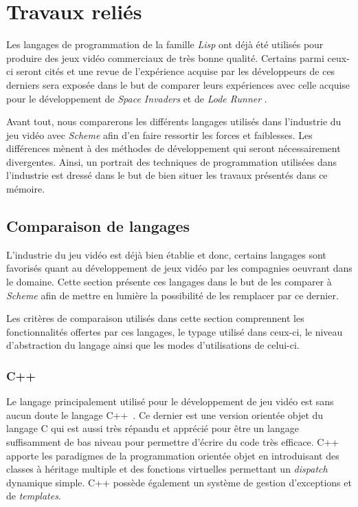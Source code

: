\documentclass[12pt,twoside,letterpaper,francais]{book}
\newcommand{\lr}{{\textit{Lode Runner }}}
\newcommand{\si}{{\textit{Space Invaders }}}
\newcommand{\lisp}{{\textit{Lisp }}}
\newcommand{\Schemelang}{{\textit{Scheme }}}
\begin{document}
\clearpage

\chapter{Travaux reliés}
Les langages de programmation de la famille \lisp ont déjà été
utilisés pour produire des jeux vidéo commerciaux de très bonne
qualité. Certains parmi ceux-ci seront cités et une revue de
l'expérience acquise par les développeurs de ces derniers sera exposée
dans le but de comparer leurs expériences avec celle acquise pour le
développement de \si et de \lr.

Avant tout, nous comparerons les différents langages utilisés dans
l'industrie du jeu vidéo avec \Schemelang afin d'en faire ressortir les
forces et faiblesses. Les différences mènent à des méthodes de
développement qui seront nécessairement divergentes. Ainsi, un
portrait des techniques de programmation utilisées dans l'industrie
est dressé dans le but de bien situer les travaux présentés dans ce
mémoire.


\FloatBarrier
\section{Comparaison de langages}
L'industrie du jeu vidéo est déjà bien établie et donc, certains
langages sont favorisés quant au développement de jeux vidéo par les
compagnies oeuvrant dans le domaine. Cette section présente ces
langages dans le but de les comparer à \Schemelang afin de mettre en
lumière la possibilité de les remplacer par ce dernier.

Les critères de comparaison utilisés dans cette section comprennent
les fonctionnalités offertes par ces langages, le typage utilisé dans
ceux-ci, le niveau d'abstraction du langage ainsi que les modes
d'utilisations de celui-ci. 


\FloatBarrier
\subsection{C++}
Le langage principalement utilisé pour le développement de jeu vidéo
est sans aucun doute le langage C++~\cite{cplusplus}. Ce dernier est
une version orientée objet du langage C\cite{Ritchie-C-dev} qui est
aussi très répandu et apprécié pour être un langage suffisamment de
bas niveau pour permettre d'écrire du code très efficace. C++ apporte
les paradigmes de la programmation orientée objet en introduisant des
classes à héritage multiple et des fonctions virtuelles permettant un
\textit{dispatch} dynamique simple. C++ possède également un système
de gestion d'exceptions et de \textit{templates}.
\end{document}
